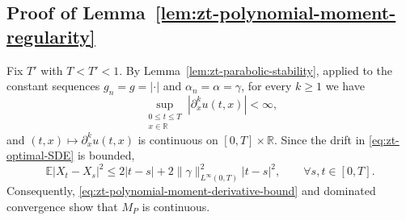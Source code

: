 \documentclass[10pt]{amsart}
\theoremstyle{definition}
\theoremstyle{remark}
\numberwithin{equation}{section}
\newcommand{\R}{\mathbb R}
\newcommand{\E}{\mathbb E}
\newcommand{\1}{\mathbf 1}
\begin{document}
\subsection{Proof of Lemma~\ref{lem:zt-polynomial-moment-regularity}}\label{a.pf.lem:zt-polynomial-moment-regularity}


Fix $T'$ with $T<T'<1$. By Lemma~\ref{lem:zt-parabolic-stability}, applied to the constant sequences $g_n=g=|\cdot|$ and $\alpha_n=\alpha=\gamma$, for every $k\geq1$ we have
\begin{equation}
 \sup_{\substack{0\leq t\leq T\\x\in\R}}|\partial_x^ku(t,x)|<\infty,
 \label{eq:zt-polynomial-moment-derivative-bound}
\end{equation}
and $(t,x)\mapsto\partial_x^ku(t,x)$ is continuous on $[0,T]\times\R$. Since the drift in \eqref{eq:zt-optimal-SDE} is bounded,
\begin{equation*}
 \E|X_t-X_s|^2\leq2|t-s|+2\|\gamma\|_{L^\infty(0,T)}^2|t-s|^2,
 \qquad \forall s,t\in[0,T].
\end{equation*}
Consequently, \eqref{eq:zt-polynomial-moment-derivative-bound} and dominated convergence show that $M_P$ is continuous.
\end{document}
